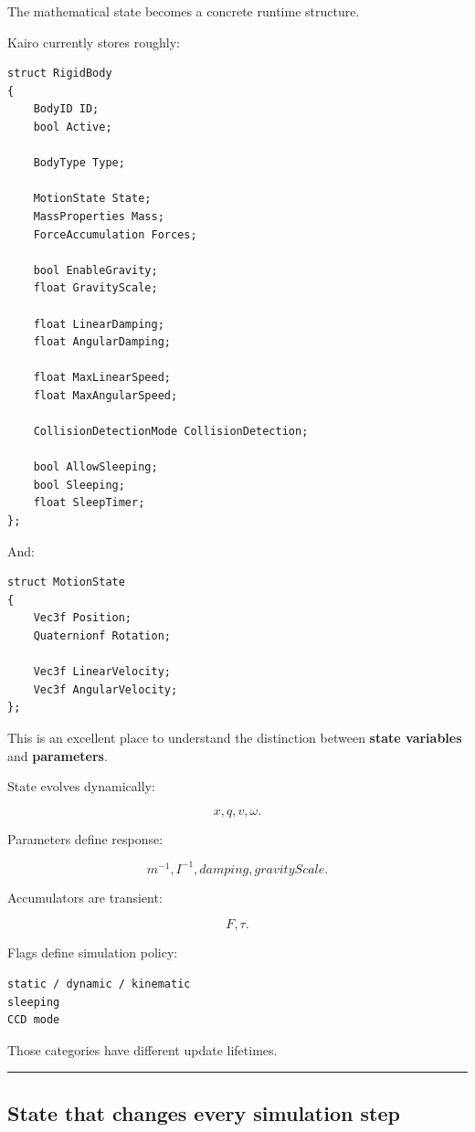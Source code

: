 The mathematical state becomes a concrete runtime structure.

Kairo currently stores roughly:

\begin{verbatim}
struct RigidBody
{
    BodyID ID;
    bool Active;

    BodyType Type;

    MotionState State;
    MassProperties Mass;
    ForceAccumulation Forces;

    bool EnableGravity;
    float GravityScale;

    float LinearDamping;
    float AngularDamping;

    float MaxLinearSpeed;
    float MaxAngularSpeed;

    CollisionDetectionMode CollisionDetection;

    bool AllowSleeping;
    bool Sleeping;
    float SleepTimer;
};
\end{verbatim}

And:

\begin{verbatim}
struct MotionState
{
    Vec3f Position;
    Quaternionf Rotation;

    Vec3f LinearVelocity;
    Vec3f AngularVelocity;
};
\end{verbatim}

This is an excellent place to understand the distinction between \textbf{state variables} and \textbf{parameters}.

State evolves dynamically:

\[
x,q,v,\omega.
\]

Parameters define response:

\[
m^{-1},I^{-1},damping,gravityScale.
\]

Accumulators are transient:

\[
F,\tau.
\]

Flags define simulation policy:

\begin{verbatim}
static / dynamic / kinematic
sleeping
CCD mode
\end{verbatim}

Those categories have different update lifetimes.

\begin{center}\rule{0.5\linewidth}{0.5pt}\end{center}

\subsection{State that changes every simulation step}\label{06-engine-ii-ch037-state-that-changes-every-simulation-step}

